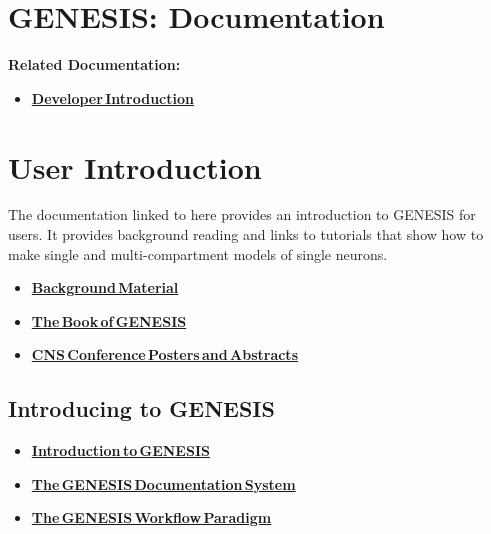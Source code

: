 \documentclass[12pt]{article}
\begin{document}
\section*{GENESIS: Documentation}

{\bf Related Documentation:}
\begin{itemize}
   \item[]\href{../developer-intro/developer-intro.tex}{\bf Developer\,Introduction}
\end{itemize}

\section*{User Introduction}

The documentation linked to here provides an introduction to GENESIS for users. It provides background reading and links to tutorials that show how to make single and multi-compartment models of single neurons.
\begin{itemize}
   \item[]\href{../background-material/background-material.tex}{\bf Background\,Material}
   \item[]\href{../book-of-genesis/book-of-genesis.tex}{\bf The\,Book\,of\,GENESIS}
   \item[]\href{../cns/cns.tex}{\bf CNS\,Conference\,Posters\,and\,Abstracts}
\end{itemize}

\subsection*{Introducing to GENESIS}
\begin{itemize}
   \item[]\href{../genesis-intro/genesis-intro.tex}{\bf Introduction\,to\,GENESIS}
   \item[]\href{../documentation-overview/documentation-overview.tex}{\bf The\,GENESIS\,Documentation\,System}
   \item[]\href{../workflow-intro/workflow-intro.tex}{\bf The\,GENESIS\,Workflow\,Paradigm}
\end{itemize}
\end{document}
